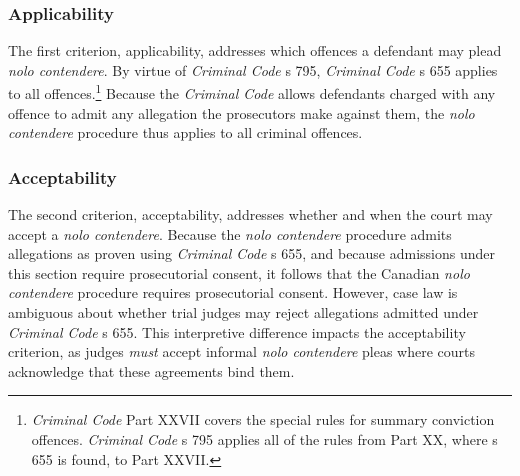 \subsubsection{Applicability}

The first criterion, applicability, addresses which offences a defendant may plead \textit{nolo contendere}. By virtue of \textit{Criminal Code} s 795, \textit{Criminal Code} s 655 applies to all offences.\footnote{\textit{Criminal Code} Part XXVII covers the special rules for summary conviction offences. \textit{Criminal Code} s 795 applies all of the rules from Part XX, where s 655 is found, to Part XXVII.} Because the \textit{Criminal Code} allows defendants charged with any offence to admit any allegation the prosecutors make against them, the \textit{nolo contendere} procedure thus applies to all criminal offences.

\subsubsection{Acceptability}

The second criterion, acceptability, addresses whether and when the court may accept a \textit{nolo contendere}. Because the \textit{nolo contendere} procedure admits allegations as proven using \textit{Criminal Code} s 655, and because admissions under this section require prosecutorial consent, it follows that the Canadian \textit{nolo contendere} procedure requires prosecutorial consent. However, case law is ambiguous about whether trial judges may reject allegations admitted under \textit{Criminal Code} s 655. This interpretive difference impacts the acceptability criterion, as judges \textit{must} accept informal \textit{nolo contendere} pleas where courts acknowledge that these agreements bind them. 

